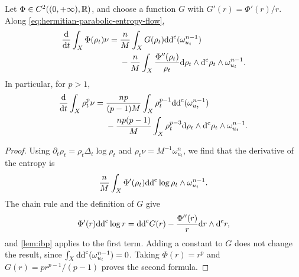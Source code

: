 \begin{proposition}\label{prop:hermitian-parabolic-entropy-identity}
Let $\Phi\in C^2((0,+\infty),\mathbb R)$, and choose a function $G$ with $G'(r)=\Phi'(r)/r$. Along \eqref{eq:hermitian-parabolic-entropy-flow},
\begin{equation}\label{eq:hermitian-parabolic-entropy-identity}
\begin{split}
 \frac{\mathrm{d}}{\mathrm{d}t}\int_X\Phi(\rho_t)\nu
 ={}&\frac nM\int_XG(\rho_t)\mathrm{dd}^{\mathrm{c}}(\omega_{u_t}^{n-1})\\
 &-\frac nM\int_X\frac{\Phi''(\rho_t)}{\rho_t}
       \mathrm{d}\rho_t\wedge\mathrm d^{\mathrm c}\rho_t\wedge\omega_{u_t}^{n-1}.
\end{split}
\end{equation}
In particular, for $p>1$,
\begin{equation}\label{eq:hermitian-parabolic-power-entropy}
\begin{split}
 \frac{\mathrm{d}}{\mathrm{d}t}\int_X\rho_t^p\nu
 ={}&\frac{np}{(p-1)M}\int_X\rho_t^{p-1}\mathrm{dd}^{\mathrm{c}}(\omega_{u_t}^{n-1})\\
 &-\frac{np(p-1)}M\int_X\rho_t^{p-3}
       \mathrm{d}\rho_t\wedge\mathrm d^{\mathrm c}\rho_t\wedge\omega_{u_t}^{n-1}.
\end{split}
\end{equation}
\end{proposition}
\begin{proof}
Using $\partial_t\rho_t=\rho_t\Delta_t\log\rho_t$ and $\rho_t\nu=M^{-1}\omega_{u_t}^n$, we find that the derivative of the entropy is
\[
 \frac nM\int_X\Phi'(\rho_t)\mathrm{dd}^{\mathrm{c}}\log\rho_t
                  \wedge\omega_{u_t}^{n-1}.
\]
The chain rule and the definition of $G$ give
\[
 \Phi'(r)\mathrm{dd}^{\mathrm{c}}\log r
 =\mathrm{dd}^{\mathrm{c}} G(r)-\frac{\Phi''(r)}r\mathrm{d}r\wedge\mathrm d^{\mathrm c} r,
\]
and \cref{lem:ibp} applies to the first term. Adding a constant to $G$ does not change the result, since $\int_X\mathrm{dd}^{\mathrm{c}}(\omega_{u_t}^{n-1})=0$. Taking $\Phi(r)=r^p$ and $G(r)=p r^{p-1}/(p-1)$ proves the second formula.
\end{proof}

